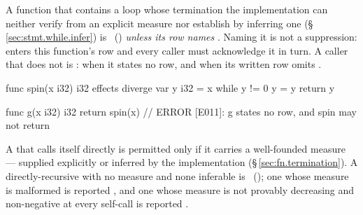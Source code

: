 \begin{constraint}
  A function that contains a  loop whose termination the
  implementation can neither verify from an explicit  measure
  nor establish by inferring one (\S\,\ref{sec:stmt.while.infer}) is
  \illformed{}~() \emph{unless its row names} .
  Naming it is not a suppression:  enters this function's row and
  every caller must acknowledge it in turn.  A caller that does not is \illformed{}:
   when it states no row, and  when its written row omits
  .
\end{constraint}

\begin{laincode}
func spin(x i32) i32 effects diverge {
    var y i32 = x
    while y != 0 { y = y }
    return y
}

func g(x i32) i32 {
    return spin(x)        // ERROR [E011]: g states no row, and spin may not return
}
\end{laincode}

\begin{constraint}
  A  that calls itself directly is permitted only if it carries a
  well-founded  measure --- supplied explicitly or inferred
  by the implementation (\S\,\ref{sec:fn.termination}).  A directly-recursive
   with no measure and none inferable is
  \illformed{}~(); one whose measure is malformed is reported
  , and one whose measure is not provably decreasing and
  non-negative at every self-call is reported .
\end{constraint}

